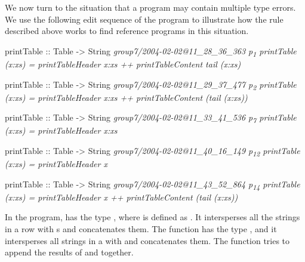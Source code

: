 \documentclass[12pt]{report}	%
\begin{document}
%
We now turn to the situation that a program may contain multiple
type errors. 
We use the following edit sequence of the program
 to illustrate 
how the rule described above works to find reference programs
in this situation.
%
%
\begin{program}
printTable :: Table -> String \hfill \it{group7/2004-02-02@11_28_36_363 \quad p\textsubscript{1}}
printTable (x:xs) = printTableHeader x:xs ++ printTableContent tail (x:xs)

printTable :: Table -> String \hfill \it{group7/2004-02-02@11_29_37_477 \quad p\textsubscript{2}}
printTable (x:xs) = printTableHeader x:xs ++ printTableContent (tail (x:xs))

printTable :: Table -> String \hfill \it{group7/2004-02-02@11_33_41_536 \quad p\textsubscript{7}}
printTable (x:xs) = printTableHeader x:xs

printTable :: Table -> String \hfill \it{group7/2004-02-02@11_40_16_149 \quad p\textsubscript{12}}
printTable (x:xs) = printTableHeader x

printTable :: Table -> String \hfill \it{group7/2004-02-02@11_43_52_864 \quad p\textsubscript{14}}
printTable (x:xs) = printTableHeader x ++ printTableContent (tail (x:xs))
\end{program}
%
%
%
%
%
%
In the program,  has the type , where  is defined as \prog{[String]}.
It intersperses all the strings in a row with
\progsq{+}s and concatenates them.  
%
The function  has the type ,
and it intersperses all strings in a  with \progsq{|}
and concatenates them.
%
The function  tries to append the results of  and  together.
%
%
\end{document}
